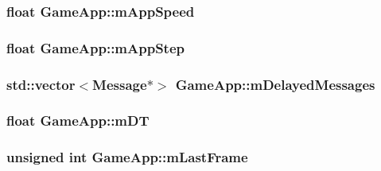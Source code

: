 \subsubsection[{\texorpdfstring{m\+App\+Speed}{mAppSpeed}}]{\setlength{\rightskip}{0pt plus 5cm}float Game\+App\+::m\+App\+Speed\hspace{0.3cm}{\ttfamily [private]}}\hypertarget{classGameApp_a8fe3b47ac85fb2b50b9f227794ca582f}{}\label{classGameApp_a8fe3b47ac85fb2b50b9f227794ca582f}
\subsubsection[{\texorpdfstring{m\+App\+Step}{mAppStep}}]{\setlength{\rightskip}{0pt plus 5cm}float Game\+App\+::m\+App\+Step\hspace{0.3cm}{\ttfamily [private]}}\hypertarget{classGameApp_ada884378414e66671636d6b6f8c4d20f}{}\label{classGameApp_ada884378414e66671636d6b6f8c4d20f}
\subsubsection[{\texorpdfstring{m\+Delayed\+Messages}{mDelayedMessages}}]{\setlength{\rightskip}{0pt plus 5cm}std\+::vector$<${\bf Message}$\ast$$>$ Game\+App\+::m\+Delayed\+Messages\hspace{0.3cm}{\ttfamily [private]}}\hypertarget{classGameApp_aa0fbe9d81547577ebdc8086b7a8ddcbb}{}\label{classGameApp_aa0fbe9d81547577ebdc8086b7a8ddcbb}
\subsubsection[{\texorpdfstring{m\+DT}{mDT}}]{\setlength{\rightskip}{0pt plus 5cm}float Game\+App\+::m\+DT\hspace{0.3cm}{\ttfamily [private]}}\hypertarget{classGameApp_acdb5789618f2ba3205207cdff535a887}{}\label{classGameApp_acdb5789618f2ba3205207cdff535a887}
\subsubsection[{\texorpdfstring{m\+Last\+Frame}{mLastFrame}}]{\setlength{\rightskip}{0pt plus 5cm}unsigned int Game\+App\+::m\+Last\+Frame\hspace{0.3cm}{\ttfamily [private]}}\hypertarget{classGameApp_a565825c1e33d2dd2f0a4139a8329d218}{}\label{classGameApp_a565825c1e33d2dd2f0a4139a8329d218}
